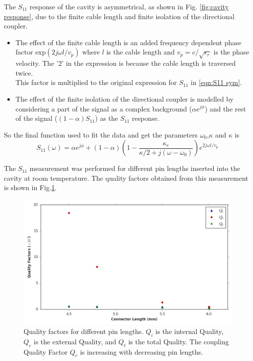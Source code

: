 The $S_{11}$ response of the cavity is asymmetrical, as shown in Fig. \ref{fig:cavity response}, due to the finite cable length and finite isolation of the directional coupler.
\begin{itemize}
\item The effect of the finite cable length is an added frequency dependent phase factor $\text{exp}(2j\omega l/v_p)$ where $l$ is the cable length and $v_p=c/\sqrt{\epsilon_r}$ is the phase velocity. The '$2$' in the expression is because the cable length is traversed twice.\\
This factor is multiplied to the original expression for $S_{11}$ in \ref{eqn:S11 sym}.
\item The effect of the finite isolation of the directional coupler is modelled by considering a part of the signal as a complex background ($\alpha e^{j\phi}$) and the rest of the signal ($(1-\alpha)S_{11}$) as the $S_{11}$ response.
\end{itemize}
So the final function used to fit the data and get the parameters $\omega_0$,$\kappa$ and $\kappa$ is
\begin{equation}
S_{11}(\omega) = \alpha e^{j\phi}+(1-\alpha)\left(1-\frac{\kappa_e}{\kappa/2+j(\omega-\omega_0)}\right)e^{2j\omega l/v_p}
\end{equation}

The $S_{11}$ measurement was performed for different pin lengths inserted into the cavity at room temperature. The quality factors obtained from this measurement is shown in Fig.\ref{fig:diff lengths}.

\begin{figure}
\centering
\includegraphics[width=\linewidth]{Figures/diff_lengths.png}
\decoRule
\caption[Quality Factors for different pin lengths]{Quality factors for different pin lengths. $Q_i$ is the internal Quality, $Q_c$ is the external Quality, and $Q_t$ is the total Quality. The coupling Quality Factor $Q_c$ is increasing with decreasing pin lengths.}
\label{fig:diff lengths}
\end{figure}

